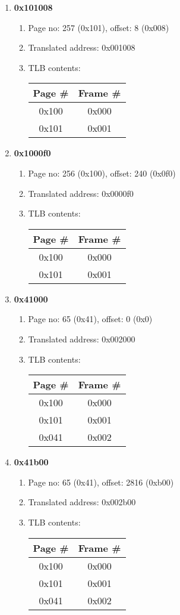 \documentclass{proc}
\begin{document}
\begin{enumerate}
\begin{enumerate}
  	\item \textbf{0x101008} \begin{enumerate}
  		\item Page no: 257 (0x101), offset: 8 (0x008)
  		\item Translated address: 0x001008
  		\item TLB contents: \begin{tabular}{c|c}
  			Page \# & Frame \# \\ \hline
  			0x100 & 0x000 \\ \hline
  			0x101 & 0x001
  		\end{tabular}
  	\end{enumerate}
  
  \item \textbf{0x1000f0} \begin{enumerate}
  		\item Page no: 256 (0x100), offset: 240 (0x0f0)
  		\item Translated address: 0x0000f0
  		\item TLB contents: \begin{tabular}{c|c}
  			Page \# & Frame \# \\ \hline
  			0x100 & 0x000 \\ \hline
  			0x101 & 0x001
  		\end{tabular}
  	\end{enumerate}
  	
  	\item \textbf{0x41000} \begin{enumerate}
  		\item Page no: 65 (0x41), offset: 0 (0x0)
  		\item Translated address: 0x002000
  		\item TLB contents: \begin{tabular}{c|c}
  			Page \# & Frame \# \\ \hline
  			0x100 & 0x000 \\ \hline
  			0x101 & 0x001 \\ \hline
  			0x041 & 0x002
  		\end{tabular}
  	\end{enumerate}
  	
  	\item \textbf{0x41b00} \begin{enumerate}
  		\item Page no: 65 (0x41), offset: 2816 (0xb00)
  		\item Translated address: 0x002b00
  		\item TLB contents: \begin{tabular}{c|c}
  			Page \# & Frame \# \\ \hline
  			0x100 & 0x000 \\ \hline
  			0x101 & 0x001 \\ \hline
  			0x041 & 0x002
  		\end{tabular}
  	\end{enumerate}
  \end{enumerate}
  
\end{enumerate}
\end{document}
